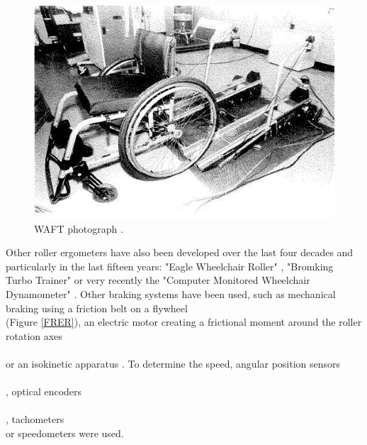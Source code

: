 \begin{figure}[h]
\center
\includegraphics[scale = 25]{images/WAFT}
\caption{WAFT photograph \cite{langbein1993research}.}
\label{WAFT}
\end{figure}


Other roller ergometers have also been developed over the last four decades and particularly in the last fifteen years: "Eagle Wheelchair Roller" \cite{kerk1995effect}, "Bromking Turbo Trainer" \cite{goosey2001kinetic} \cite{goosey2001kinetic} \cite{ price1999thermoregulatory} or very recently the "Computer Monitored Wheelchair Dynamometer" \cite{cooper2003wheelchair}  \cite{digiovine2001dynamic}.  Other braking systems have been used, such as mechanical braking using a friction belt on a flywheel\\\cite{goosey1998relationship}  \cite{kulig2001effect} \cite{rodgers1994biomechanics}(Figure \ref{FRER}), an electric motor creating a frictional moment around the roller rotation axes \\\cite{coutts1987aerobic} \cite{kerk1995effect} \cite{patterson1997selected}     \\ \cite{vanlandewijck1999field} or an isokinetic apparatus  \cite{ruggles1994biomechanics}. To determine the speed, angular position sensors  \cite{brouha1967continuous}  \\ \cite{coutts1987aerobic}  \cite{coutts1990kinematics}  \cite{patterson1997selected} \\ \cite{rodgers1994biomechanics}, optical encoders   \cite{devillard1999wheelchair} \cite{devillard2001validation}   \\ \cite{langbein1993calibration}  \cite{langbein1994initial}  \cite{newsam1996temporal}  \\ \cite{theisen1996new}, tachometers  \cite{cooper1990exploratory}  \cite{kerk1995effect}   \cite{masse1992biomechanical} \\  \cite{vanlandewijck1999field} or speedometers   \cite{goosey1998relationship}  \cite{rodgers1994biomechanics} were used.


